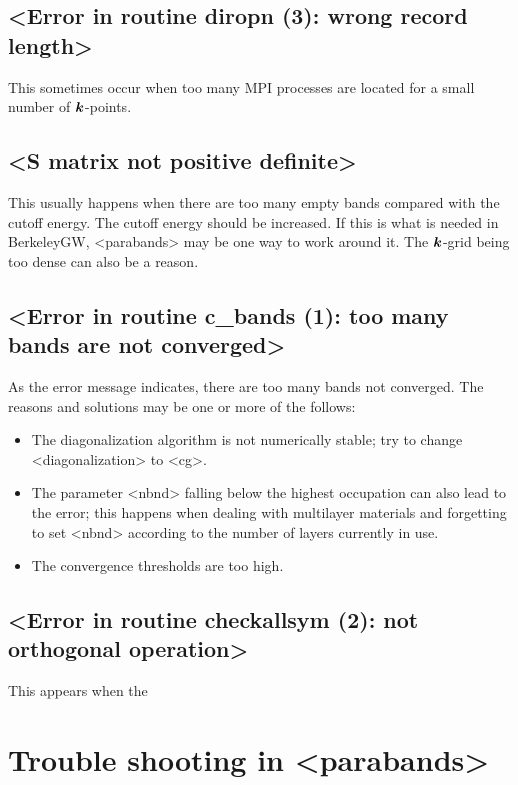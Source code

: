 \documentclass[hyperref, a4paper, 12pt]{report}
\def\texttt#1{<#1>}%
\newcommand{\shortcode}[1]{\texttt{#1}}
\begin{document}
\subsection{\shortcode{Error in routine diropn (3): wrong record length}}

This sometimes occur when too many MPI processes are located 
for a small number of $\vb*{k}$-points.

\subsection{\shortcode{S matrix not positive definite}}

This usually happens when there are too many empty bands
compared with the cutoff energy.
The cutoff energy should be increased.
If this is what is needed in BerkeleyGW, 
\shortcode{parabands} may be one way to work around it.
The $\vb*{k}$-grid being too dense can also be a reason.

\subsection{\shortcode{Error in routine c_bands (1): too many bands are not converged}}

As the error message indicates, there are too many bands not converged.
The reasons and solutions may be one or more of the follows:
\begin{itemize}
    \item The diagonalization algorithm is not numerically stable;
        try to change \shortcode{diagonalization} to \shortcode{cg}.
    \item The parameter \shortcode{nbnd} 
        falling below the highest occupation can also lead to the error; 
        this happens when dealing with multilayer materials 
        and forgetting to set \shortcode{nbnd} 
        according to the number of layers currently in use.
    \item The convergence thresholds are too high.
\end{itemize}

\subsection{\shortcode{Error in routine checkallsym (2): not orthogonal operation}}

This appears when the


\section{Trouble shooting in \shortcode{parabands}}
\end{document}
